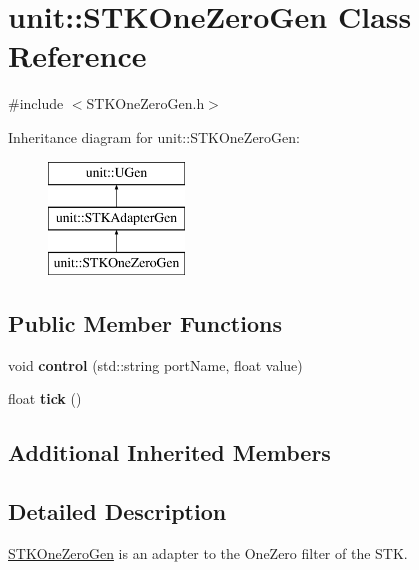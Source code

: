 \hypertarget{classunit_1_1STKOneZeroGen}{\section{unit\-:\-:S\-T\-K\-One\-Zero\-Gen Class Reference}
\label{classunit_1_1STKOneZeroGen}
}


{\ttfamily \#include $<$S\-T\-K\-One\-Zero\-Gen.\-h$>$}

Inheritance diagram for unit\-:\-:S\-T\-K\-One\-Zero\-Gen\-:\begin{figure}[H]
\begin{center}
\leavevmode
\includegraphics[height=3.000000cm]{classunit_1_1STKOneZeroGen}
\end{center}
\end{figure}
\subsection*{Public Member Functions}
\begin{DoxyCompactItemize}
\item 
\hypertarget{classunit_1_1STKOneZeroGen_a44bc26cf6f0e7218f9f14447c957dce4}{void {\bfseries control} (std\-::string port\-Name, float value)}\label{classunit_1_1STKOneZeroGen_a44bc26cf6f0e7218f9f14447c957dce4}

\item 
\hypertarget{classunit_1_1STKOneZeroGen_ab1118ea13c6892f49c8f92f017b82908}{float {\bfseries tick} ()}\label{classunit_1_1STKOneZeroGen_ab1118ea13c6892f49c8f92f017b82908}

\end{DoxyCompactItemize}
\subsection*{Additional Inherited Members}


\subsection{Detailed Description}
\hyperlink{classunit_1_1STKOneZeroGen}{S\-T\-K\-One\-Zero\-Gen} is an adapter to the One\-Zero filter of the S\-T\-K.

